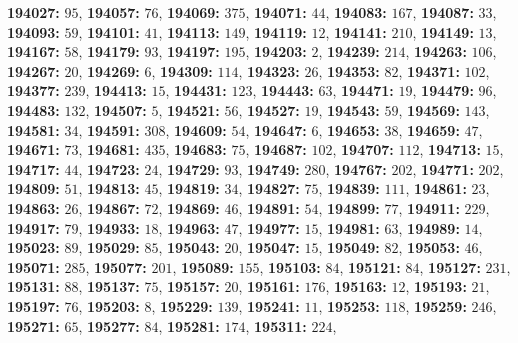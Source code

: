 \textsf{\bfseries 194027:} $95$, \textsf{\bfseries 194057:} $76$, \textsf{\bfseries 194069:} $375$, \textsf{\bfseries 194071:} $44$, \textsf{\bfseries 194083:} $167$, \textsf{\bfseries 194087:} $33$, \textsf{\bfseries 194093:} $59$, \textsf{\bfseries 194101:} $41$, \textsf{\bfseries 194113:} $149$, \textsf{\bfseries 194119:} $12$, \textsf{\bfseries 194141:} $210$, \textsf{\bfseries 194149:} $13$, \textsf{\bfseries 194167:} $58$, \textsf{\bfseries 194179:} $93$, \textsf{\bfseries 194197:} $195$, \textsf{\bfseries 194203:} $2$, \textsf{\bfseries 194239:} $214$, \textsf{\bfseries 194263:} $106$, \textsf{\bfseries 194267:} $20$, \textsf{\bfseries 194269:} $6$, \textsf{\bfseries 194309:} $114$, \textsf{\bfseries 194323:} $26$, \textsf{\bfseries 194353:} $82$, \textsf{\bfseries 194371:} $102$, \textsf{\bfseries 194377:} $239$, \textsf{\bfseries 194413:} $15$, \textsf{\bfseries 194431:} $123$, \textsf{\bfseries 194443:} $63$, \textsf{\bfseries 194471:} $19$, \textsf{\bfseries 194479:} $96$, \textsf{\bfseries 194483:} $132$, \textsf{\bfseries 194507:} $5$, \textsf{\bfseries 194521:} $56$, \textsf{\bfseries 194527:} $19$, \textsf{\bfseries 194543:} $59$, \textsf{\bfseries 194569:} $143$, \textsf{\bfseries 194581:} $34$, \textsf{\bfseries 194591:} $308$, \textsf{\bfseries 194609:} $54$, \textsf{\bfseries 194647:} $6$, \textsf{\bfseries 194653:} $38$, \textsf{\bfseries 194659:} $47$, \textsf{\bfseries 194671:} $73$, \textsf{\bfseries 194681:} $435$, \textsf{\bfseries 194683:} $75$, \textsf{\bfseries 194687:} $102$, \textsf{\bfseries 194707:} $112$, \textsf{\bfseries 194713:} $15$, \textsf{\bfseries 194717:} $44$, \textsf{\bfseries 194723:} $24$, \textsf{\bfseries 194729:} $93$, \textsf{\bfseries 194749:} $280$, \textsf{\bfseries 194767:} $202$, \textsf{\bfseries 194771:} $202$, \textsf{\bfseries 194809:} $51$, \textsf{\bfseries 194813:} $45$, \textsf{\bfseries 194819:} $34$, \textsf{\bfseries 194827:} $75$, \textsf{\bfseries 194839:} $111$, \textsf{\bfseries 194861:} $23$, \textsf{\bfseries 194863:} $26$, \textsf{\bfseries 194867:} $72$, \textsf{\bfseries 194869:} $46$, \textsf{\bfseries 194891:} $54$, \textsf{\bfseries 194899:} $77$, \textsf{\bfseries 194911:} $229$, \textsf{\bfseries 194917:} $79$, \textsf{\bfseries 194933:} $18$, \textsf{\bfseries 194963:} $47$, \textsf{\bfseries 194977:} $15$, \textsf{\bfseries 194981:} $63$, \textsf{\bfseries 194989:} $14$, \textsf{\bfseries 195023:} $89$, \textsf{\bfseries 195029:} $85$, \textsf{\bfseries 195043:} $20$, \textsf{\bfseries 195047:} $15$, \textsf{\bfseries 195049:} $82$, \textsf{\bfseries 195053:} $46$, \textsf{\bfseries 195071:} $285$, \textsf{\bfseries 195077:} $201$, \textsf{\bfseries 195089:} $155$, \textsf{\bfseries 195103:} $84$, \textsf{\bfseries 195121:} $84$, \textsf{\bfseries 195127:} $231$, \textsf{\bfseries 195131:} $88$, \textsf{\bfseries 195137:} $75$, \textsf{\bfseries 195157:} $20$, \textsf{\bfseries 195161:} $176$, \textsf{\bfseries 195163:} $12$, \textsf{\bfseries 195193:} $21$, \textsf{\bfseries 195197:} $76$, \textsf{\bfseries 195203:} $8$, \textsf{\bfseries 195229:} $139$, \textsf{\bfseries 195241:} $11$, \textsf{\bfseries 195253:} $118$, \textsf{\bfseries 195259:} $246$, \textsf{\bfseries 195271:} $65$, \textsf{\bfseries 195277:} $84$, \textsf{\bfseries 195281:} $174$, \textsf{\bfseries 195311:} $224$, 
